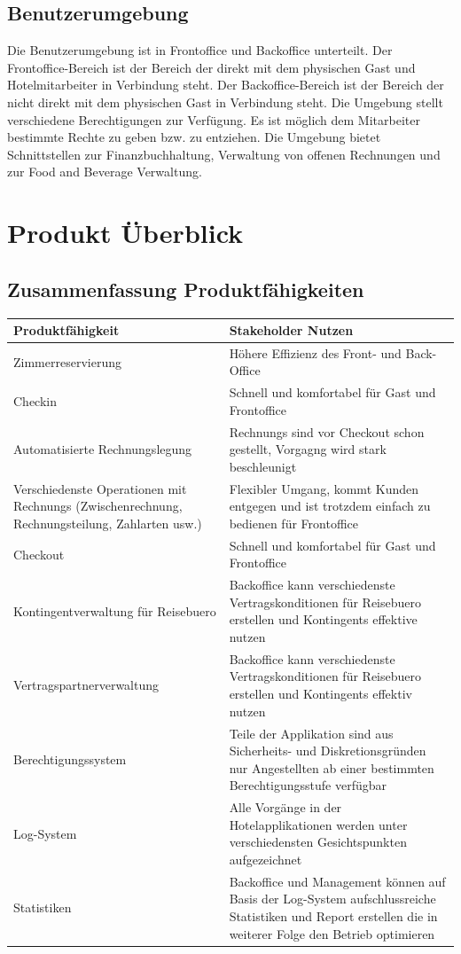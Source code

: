 \documentclass[10pt,a4paper,titlepage]{article}
\begin{document}
\subsection{Benutzerumgebung}
Die Benutzerumgebung ist in Frontoffice und Backoffice unterteilt. Der Frontoffice-Bereich ist der Bereich der direkt mit dem physischen Gast und Hotelmitarbeiter in Verbindung steht. Der Backoffice-Bereich ist der Bereich der nicht direkt mit dem physischen Gast in Verbindung steht. Die Umgebung stellt verschiedene Berechtigungen zur Verfügung. Es ist möglich dem Mitarbeiter bestimmte Rechte zu geben bzw. zu entziehen. Die Umgebung bietet Schnittstellen zur Finanzbuchhaltung, Verwaltung von offenen Rechnungen und zur Food and Beverage Verwaltung.

\newpage

\section{Produkt Überblick}
\subsection{Zusammenfassung Produktfähigkeiten}
\begin{tabular}{|p{5.7cm}|p{5.7cm}|}
	\hline
	\textbf{Produktfähigkeit} &
	\textbf{Stakeholder Nutzen}
	\\
	\hline
	Zimmerreservierung &
	Höhere Effizienz des Front- und Back-Office
	\\
	\hline
	\Gls{Checkin} &
	Schnell und komfortabel für \Gls{Gast} und \Gls{Frontoffice}
	\\
	\hline
	Automatisierte Rechnungslegung &
	\Glspl{Rechnung} sind vor \Gls{Checkout} schon gestellt, Vorgagng wird stark beschleunigt
	\\
	\hline
	Verschiedenste Operationen mit \Glspl{Rechnung} (\Gls{Zwischenrechnung}, Rechnungsteilung, Zahlarten usw.) &
	Flexibler Umgang, kommt \Gls{Kunde}n entgegen und ist trotzdem einfach zu bedienen für \Gls{Frontoffice}
	\\
	\hline
	\Gls{Checkout} &
	Schnell und komfortabel für Gast und \Gls{Frontoffice}
	\\
	\hline
	Kontingentverwaltung für \Gls{Reisebuero} &
	\Gls{Backoffice} kann verschiedenste Vertragskonditionen für \Gls{Reisebuero} erstellen und \Glspl{Kontingent} effektive nutzen
	\\
	\hline
	Vertragspartnerverwaltung &
	\Gls{Backoffice} kann verschiedenste Vertragskonditionen für \Gls{Reisebuero} erstellen und \Glspl{Kontingent} effektiv nutzen
	\\
	\hline
	Berechtigungssystem &
	Teile der Applikation sind aus Sicherheits- und Diskretionsgründen nur Angestellten ab einer bestimmten Berechtigungsstufe verfügbar
	\\
	\hline
	Log-System &
	Alle Vorgänge in der Hotelapplikationen werden unter verschiedensten Gesichtspunkten aufgezeichnet
	\\
	\hline
	Statistiken &
	\Gls{Backoffice} und Management können auf Basis der Log-System aufschlussreiche Statistiken und Report erstellen die in weiterer Folge den Betrieb optimieren
	\\
	\hline
\end{tabular}
\end{document}

